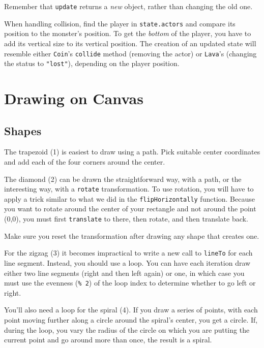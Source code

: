 Remember that \lstinline`update` returns a \emph{new} object, rather than changing the old one.

When handling collision, find the player in \lstinline`state.actors` and compare its position to the monster's position. To get the \emph{bottom} of the player, you have to add its vertical size to its vertical position. The creation of an updated state will resemble either \lstinline`Coin`'s \lstinline`collide` method (removing the actor) or \lstinline`Lava`'s (changing the status to \lstinline`"lost"`), depending on the player position.

\section{Drawing on Canvas}

\subsection{Shapes}

The trapezoid (1) is easiest to draw using a path. Pick suitable center coordinates and add each of the four corners around the center.

The diamond (2) can be drawn the straightforward way, with a path, or the interesting way, with a \lstinline`rotate` transformation. To use rotation, you will have to apply a trick similar to what we did in the \lstinline`flipHorizontally` function. Because you want to rotate around the center of your rectangle and not around the point (0,0), you must first \lstinline`translate` to there, then rotate, and then translate back.

Make sure you reset the transformation after drawing any shape that creates one.

For the zigzag (3) it becomes impractical to write a new call to \lstinline`lineTo` for each line segment. Instead, you should use a loop. You can have each iteration draw either two line segments (right and then left again) or one, in which case you must use the evenness (\lstinline`% 2`) of the loop index to determine whether to go left or right.

You'll also need a loop for the spiral (4). If you draw a series of points, with each point moving further along a circle around the spiral's center, you get a circle. If, during the loop, you vary the radius of the circle on which you are putting the current point and go around more than once, the result is a spiral.

